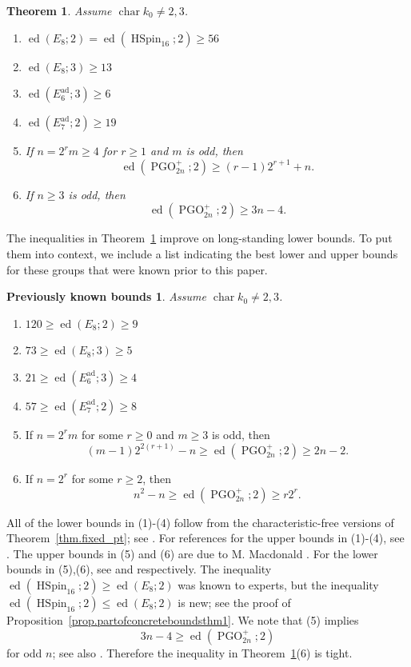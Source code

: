 \documentclass[12pt]{amsart}
\numberwithin{equation}{section}
\newtheorem{theorem}{Theorem}[section]
\theoremstyle{definition}
\newtheorem*{prev}{Previously known bounds}
\newcommand{\ad}{\mathrm{ad}}
\newcommand{\PGO}{\operatorname{PGO}}
\newcommand{\ed}{\operatorname{ed}}
\newcommand{\Char}{\operatorname{char}}
\newcommand{\HSpin}{\operatorname{HSpin}}
\begin{document}
\begin{theorem}\label{thm.concrete_bounds}
    Assume  $\Char k_0 \neq 2,3$. 
    \begin{enumerate}
        \item $\ed(E_8;2) = \ed(\HSpin_{16};2) \geq 56$
        \item $ \ed(E_8;3) \geq 13$
        \item $\ed(E_6^{\ad};3) \geq 6$
        \item $ \ed(E_7^{\ad};2) \geq 19$
        \item If $n  =  2^r m\geq 4$ for $r\geq 1$ and $m$ is odd, then $$\ed(\PGO^+_{2n};2) \geq   (r -1)2^{r+1} +n.$$
        \item If $n \geq 3$ is odd, then  $$\ed(\PGO^+_{2n};2) \geq   3n-4.$$
    \end{enumerate}
\end{theorem}
 The inequalities in Theorem~\ref{thm.concrete_bounds} improve on long-standing lower bounds. To put them into context, we include a list indicating the best lower and upper bounds for these groups that were known prior to this paper.
 \begin{prev}\itshape
 Assume  $\Char k_0 \neq 2,3$. 
\begin{enumerate}
        \item $120 \geq \ed(E_8;2)\geq 9$
        \item $73 \geq \ed(E_8;3) \geq 5$
        \item $21\geq \ed(E_6^{\ad};3) \geq 4$
        \item $57\geq \ed(E_7^{\ad};2) \geq 8$
        \item If $n  =  2^r m$ for some $r\geq 0$ and $m\geq 3$ is odd, then 
        $$(m - 1)2^{2(r+1)} - n \geq\ed(\PGO^+_{2n};2) \geq  2n-2.$$
        \item If $n = 2^r$  for some $r\geq 2$, then  $$n^2 - n \geq \ed(\PGO^+_{2n};2) \geq   r 2^r.$$
    \end{enumerate}
 \end{prev}
All of the lower bounds in (1)-(4) follow from the characteristic-free versions of Theorem~\ref{thm.fixed_pt}; see \cite{chernousov2006lower,gille2009lower}. For references for the upper bounds in (1)-(4), see \cite[3h]{merkurjev-survey}. 
The upper bounds in (5) and (6) are due to M. Macdonald \cite[Section 0.2]{macdonald}. For the lower bounds in (5),(6), see \cite[Theorem 13]{chernousov2006lower} and \cite[Lemma 2.6]{baek2015essential} respectively. The inequality $\ed(\HSpin_{16};2) \geq \ed(E_8;2)$ was known to experts, but the inequality $\ed(\HSpin_{16};2) \leq \ed(E_8;2)$ is new; see the proof of Proposition~\ref{prop.partofconcreteboundsthm1}. We note that (5) implies $$3n-4 \geq \ed(\PGO^+_{2n} ;2)$$
for odd $n$; see also \cite[Corollary 3.2]{baek2015essential}. Therefore the inequality in Theorem~\ref{thm.concrete_bounds}(6) is tight. %
\end{document}
